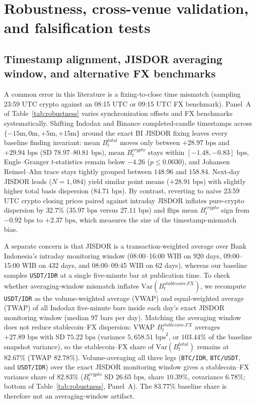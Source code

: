 \section{Robustness, cross-venue validation, and falsification tests}
\label{sec:robustness}

\subsection{Timestamp alignment, JISDOR averaging window, and alternative FX benchmarks}
A common error in this literature is a fixing-to-close time mismatch (sampling 23:59 UTC crypto against an 08:15 UTC or 09:15 UTC FX benchmark). Panel~A of Table~\ref{tab:robustness} varies synchronization offsets and FX benchmarks systematically. Shifting Indodax and Binance completed-candle timestamps across $\{-15\text{m}, 0\text{m}, +5\text{m}, +15\text{m}\}$ around the exact BI JISDOR fixing leaves every baseline finding invariant: mean $B_t^{total}$ moves only between $+28.97\text{ bps}$ and $+29.94\text{ bps}$ (SD $78.97$--$80.81\text{ bps}$), mean $B_t^{crypto}$ stays within $[-1.48, -0.83]\text{ bps}$, Engle--Granger $t$-statistics remain below $-4.26$ ($p \le 0.0030$), and Johansen Reinsel--Ahn trace stays tightly grouped between $148.96$ and $158.84$. Next-day JISDOR leads ($N = 1,084$) yield similar point means ($+28.91\text{ bps}$) with slightly higher total basis dispersion ($84.71\text{ bps}$). By contrast, reverting to naive 23:59 UTC crypto closing prices paired against intraday JISDOR inflates pure-crypto dispersion by $32.7\%$ ($35.97\text{ bps}$ versus $27.11\text{ bps}$) and flips mean $B_t^{crypto}$ sign from $-0.92\text{ bps}$ to $+2.37\text{ bps}$, which measures the size of the timestamp-mismatch bias.



A separate concern is that JISDOR is a transaction-weighted average over Bank Indonesia's intraday monitoring window (08:00--16:00 WIB on 920 days, 09:00--15:00 WIB on 432 days, and 08:00--09:45 WIB on 62 days), whereas our baseline samples \texttt{USDT/IDR} at a single five-minute bar at publication time. To check whether averaging-window mismatch inflates $\mathrm{Var}(B_t^{stablecoin\text{-}FX})$, we recompute \texttt{USDT/IDR} as the volume-weighted average (VWAP) and equal-weighted average (TWAP) of all Indodax five-minute bars inside each day's exact JISDOR monitoring window (median 97 bars per day). Matching the averaging window does not reduce stablecoin--FX dispersion: VWAP $B_t^{stablecoin\text{-}FX}$ averages $+27.89\text{ bps}$ with SD $75.22\text{ bps}$ (variance $5,658.51\text{ bps}^2$, or $103.44\%$ of the baseline snapshot variance), so the stablecoin--FX share of $\mathrm{Var}(B_t^{total})$ remains at $82.67\%$ (TWAP $82.78\%$). Volume-averaging all three legs (\texttt{BTC/IDR}, \texttt{BTC/USDT}, and \texttt{USDT/IDR}) over the exact JISDOR monitoring window gives a stablecoin--FX variance share of $82.83\%$ ($B_t^{crypto}$ SD $26.65\text{ bps}$, share $10.39\%$, covariance $6.78\%$; bottom of Table~\ref{tab:robustness}, Panel~A). The $83.77\%$ baseline share is therefore not an averaging-window artifact.

